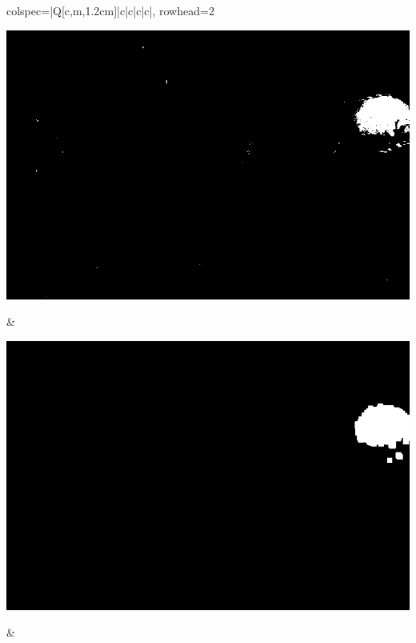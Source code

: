 \begin{longtblr}[
            caption = {Hasil uji coba proses \textit{background subtraction} menggunakan GMM yang disempurnakan oleh Operasi Morfologi},
            label = {tab:gmm_morph_9908}
        ]{
            colspec={|Q[c,m,1.2cm]|c|c|c|c|},
            rowhead=2
        }
\begin{minipage}{0.19\textwidth}
                \includegraphics[width=\linewidth]{image/9866/9866_gmm_frame849.jpg}
            \end{minipage} & 
            \begin{minipage}{0.19\textwidth}
                \includegraphics[width=\linewidth]{image/9866/9866_dilated_3x9_frame849.jpg}
            \end{minipage} &
            \begin{minipage}{0.19\textwidth}

\end{minipage}
\end{longtblr}

